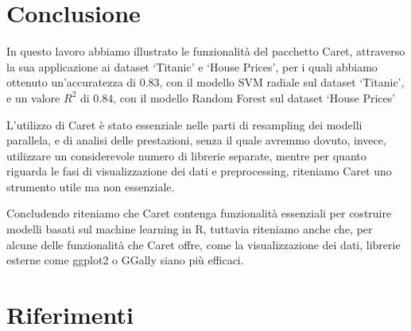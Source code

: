 \documentclass[12pt]{article}
\begin{document}
\section{Conclusione}
In questo lavoro abbiamo illustrato le funzionalità del pacchetto Caret, attraverso la sua applicazione ai dataset ‘Titanic’ e ‘House Prices’, per i quali 
abbiamo ottenuto un'accuratezza di $0.83$, con il modello SVM radiale sul dataset ‘Titanic’, e un valore $R^2$ di $0.84$, con il modello Random Forest sul dataset ‘House Prices’

L'utilizzo di Caret è stato essenziale nelle parti di resampling dei modelli parallela, e di analisi delle prestazioni, senza il quale avremmo dovuto, invece, utilizzare un considerevole numero di librerie separate, 
mentre per quanto riguarda le fasi di visualizzazione dei dati e preprocessing, riteniamo Caret uno strumento utile ma non essenziale.

Concludendo riteniamo che Caret contenga funzionalità essenziali per costruire modelli basati sul machine learning in R, tuttavia riteniamo anche che, per alcune delle funzionalità che Caret offre, come la visualizzazione dei dati, 
librerie esterne come ggplot2 o GGally siano più efficaci.
\section{Riferimenti}


\end{document}
